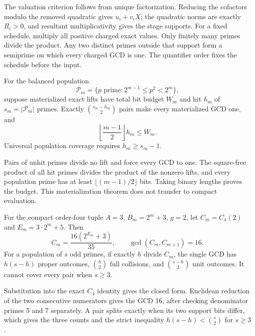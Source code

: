 \documentclass[11pt]{article}
\begin{document}
\begin{claimproof}
The valuation criterion follows from unique factorization.  Reducing the
cofactors modulo the removed quadratic gives \(u_i+v_iX\); the quadratic
norms are exactly \(R_i>0\), and resultant multiplicativity gives the stage
supports.  For a fixed schedule, multiply all positive charged exact values.
Only finitely many primes divide the product.  Any two distinct primes
outside that support form a semiprime on which every charged GCD is one.
The quantifier order fixes the schedule before the input.
\end{claimproof}

{}
For the balanced population
\[
 \mathcal P_m=\{p\text{ prime}:2^{m-1}\le p^2<2^m\},
\]
suppose materialized exact lifts have total bit budget \(W_m\) and hit
\(h_m\) of \(s_m=|\mathcal P_m|\) primes.  Exactly
\(\binom{s_m-h_m}{2}\) pairs make every materialized GCD one, and
\[
 \left\lfloor\frac{m-1}{2}\right\rfloor h_m\le W_m.
\]
Universal population coverage requires \(h_m\ge s_m-1\).

\begin{claimproof}
Pairs of unhit primes divide no lift and force every GCD to one.  The
square-free product of all hit primes divides the product of the nonzero
lifts, and every population prime has at least
\(\lfloor(m-1)/2\rfloor\) bits.  Taking binary lengths proves the budget.
This materialization theorem does not transfer to compact evaluation.
\end{claimproof}

{}
For the compact order-four tuple
\(A=3\), \(B_m=2^m+3\), \(g=2\), let \(C_m=C_4(2)\) and
\(E_m=3\cdot2^m+5\).  Then
\[
 C_m=\frac{16(2^{E_m}+3)}{35},\qquad
 \gcd(C_m,C_{m+1})=16.
\]
For a population of \(s\) odd primes, if exactly \(h\) divide \(C_m\), the
single GCD has \(h(s-h)\) proper outcomes,
\(\binom h2\) full collisions, and \(\binom{s-h}{2}\) unit outcomes.  It
cannot cover every pair when \(s\ge3\).

\begin{claimproof}
Substitution into the exact \(C_4\) identity gives the closed form.
Euclidean reduction of the two consecutive numerators gives the GCD 16,
after checking denominator primes 5 and 7 separately.  A pair splits exactly
when its two support bits differ, which gives the three counts and the
strict inequality \(h(s-h)<\binom s2\) for \(s\ge3\).
\end{claimproof}
\end{document}
